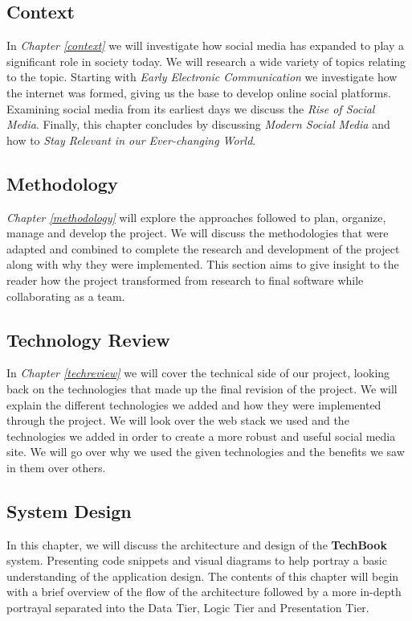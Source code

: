 \subsection{Context}
In \textit{Chapter \ref{context}} we will investigate how social media has expanded to play a significant role in society today. We will research a wide variety of topics relating to the topic. Starting with \textit{Early Electronic Communication} we investigate how the internet was formed, giving us the base to develop online social platforms. Examining social media from its earliest days we discuss the \textit{Rise of Social Media}. Finally, this chapter concludes by discussing \textit{Modern Social Media} and how to \textit{Stay Relevant in our Ever-changing World}.

\subsection{Methodology}
\textit{Chapter \ref{methodology}} will explore the approaches followed to plan, organize, manage and develop the project. We will discuss the methodologies that were adapted and combined to complete the research and development of the project along with why they were implemented. This section aims to give insight to the reader how the project transformed from research to final software while collaborating as a team.

\subsection{Technology Review}
In \textit{Chapter \ref{techreview}} we will cover the technical side of our project, looking back on the technologies that made up the final revision of the project. We will explain the different technologies we added and how they were implemented through the project. We will look over the web stack we used and the technologies we added in order to create a more robust and useful social media site. We will go over why we used the given technologies and the benefits we saw in them over others.

\subsection{System Design}
In this chapter, we will discuss the architecture and design of the \textbf{TechBook} system. Presenting code snippets and visual diagrams to help portray a basic understanding of the application design. The contents of this chapter will begin with a brief overview of the flow of the architecture followed by a more in-depth portrayal separated into the Data Tier, Logic Tier and Presentation Tier.

